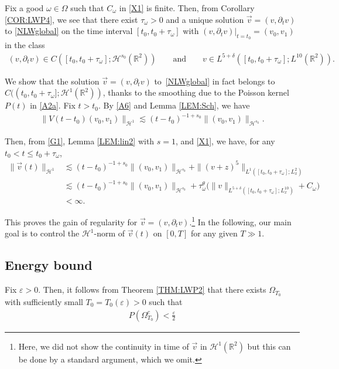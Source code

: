 \documentclass[letterpaper, 11pt,  reqno]{amsart}
\newcommand{\1}{\hspace{0.5mm}\text{I}\hspace{0.2mm}}
\newcommand{\noi}{\noindent}
\newcommand{\R}{\mathbb{R}}
\newcommand{\dl}{\delta}
\newcommand{\eps}{\varepsilon}
\newcommand{\dt}{\partial_t}
\newcommand{\ta}{\theta}
\renewcommand{\o}{\omega}
\renewcommand{\O}{\Omega}
\newcommand{\les}{\lesssim}
\renewcommand{\H}{\mathcal{H}}
\numberwithin{equation}{section}
\numberwithin{theorem}{section}
\begin{document}
\noi
Fix a good $\o\in \O$ such that $C_\o$ in \eqref{X1} is finite.
Then, from Corollary \ref{COR:LWP4}, 
we see that 
there exist $\tau_\o > 0$ and  a unique solution $\vec v = (v, \dt v)$ to \eqref{NLWglobal}
on the time interval $[t_0, t_0 + \tau_\o]$
with $(v, \dt v) |_{t = t_0} = (v_0, v_1)$
in the class
\begin{align*}
 (v, \dt v) \in C([t_0,  t_0 + \tau_\o]; \H^{s_0} (\R^2))
\qquad \text{and}\qquad 
v\in  L^{5+\dl}([t_0, t_0 + \tau_\o];  L^{10}(\R^2)).
\end{align*}


We  show that the solution $\vec v = (v, \dt v)$ to~\eqref{NLWglobal} in fact belongs
to $C((t_0,  t_0 + \tau_\o]; \H^1(\R^2))$, thanks to the smoothing due to the Poisson kernel $P(t)$ in \eqref{A2a}.
Fix $t > t_0$. By 
\eqref{A6} and Lemma \ref{LEM:Sch},
we have
\begin{align}
\|V(t-t_0) (v_0, v_1) \|_{\H^1}
\les (t-t_0)^{-1+s_0} \|(v_0, v_1 )\|_{\H^{s_0}}.
\label{G1}
\end{align}

\noi
Then, from \eqref{G1}, 
Lemma \ref{LEM:lin2} with $s = 1$, 
and \eqref{X1}, 
we have, for any $t_0 < t \leq t_0 +\tau_\o$,  
\begin{align*}
\|\vec v(t)\|_{\H^1} 
& \les   (t-t_0)^{-1+s_0} \|(v_0, v_1 )\|_{\H^{s_0}}
+ \|(v+z)^5\|_{L^1([t_0, t_0+\tau_\o]; L^2_x)}\\ 
& \les (t-t_0)^{-1+s_0}\| (v_0, v_1) \|_{\H^{s_0}}
+ \tau_\o^\ta \Big(\|v\|_{L^{5+\dl}([t_0, t_0+\tau_\o]; L^{10}_x)}
+ C_\o\Big)\\
& < \infty.
\end{align*}

\noi
This proves the gain of regularity for $\vec v = (v, \dt v)$.\footnote{Here, 
we did not show the continuity in time of $\vec v$ in $\H^1(\R^2)$
but this can be done by a standard argument, which we omit.}
In the following, our main goal is to control the $\H^1$-norm of $\vec v(t)$ on $[0, T]$
for any given $T \gg 1$.


\subsection{Energy bound}
\label{SUBSEC:GWP2}

\medskip
Fix $\eps > 0$.
Then, it follows from Theorem \ref{THM:LWP2} 
that there exists $\O_{T_0}$ with sufficiently small $T_0 = T_0(\eps) > 0$ such that 
\begin{align}
P( \O_{T_0}^c) < \frac \eps 2
\label{G2}
\end{align}
\end{document}
